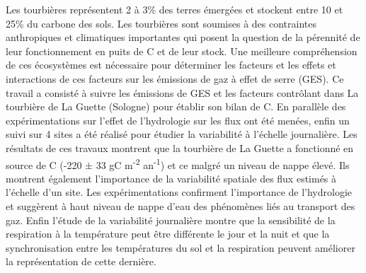 {\begin{framed}
	\begin{minipage}{\dimexpr\textwidth-2\fboxrule-2\fboxsep}
	Les tourbières représentent 2 à 3\% des terres émergées et stockent entre 10 et 25\% du carbone des sols. 
	Les tourbières sont soumises à des contraintes anthropiques et climatiques importantes qui posent la question de la pérennité de leur fonctionnement en puits de C et de leur stock. Une meilleure compréhension de ces écosystèmes est nécessaire pour déterminer les facteurs et les effets et interactions de ces facteurs sur les émissions de gaz à effet de serre (GES).
	Ce travail a consisté à suivre les émissions de GES et les facteurs contrôlant dans La tourbière de La Guette (Sologne) pour établir son bilan de C. En parallèle des expérimentations sur l'effet de l'hydrologie sur les flux ont été menées, enfin un suivi sur 4 sites a été réalisé pour étudier la variabilité à l'échelle journalière.
	Les résultats de ces travaux montrent que la tourbière de La Guette a fonctionné en source de C (-220 $\pm$ 33 gC m\textsuperscript{-2} an\textsuperscript{-1}) et ce malgré un niveau de nappe élevé. %
	Ils montrent également l'importance de la variabilité spatiale des flux estimés à l'échelle d'un site. Les expérimentations confirment l'importance de l'hydrologie et suggèrent à haut niveau de nappe d'eau des phénomènes liés au transport des gaz. Enfin l'étude de la variabilité journalière montre que la sensibilité de la respiration à la température peut être différente le jour et la nuit et que la synchronisation entre les températures du sol et la respiration peuvent améliorer la représentation de cette dernière.

\end{minipage}
\end{framed}}
